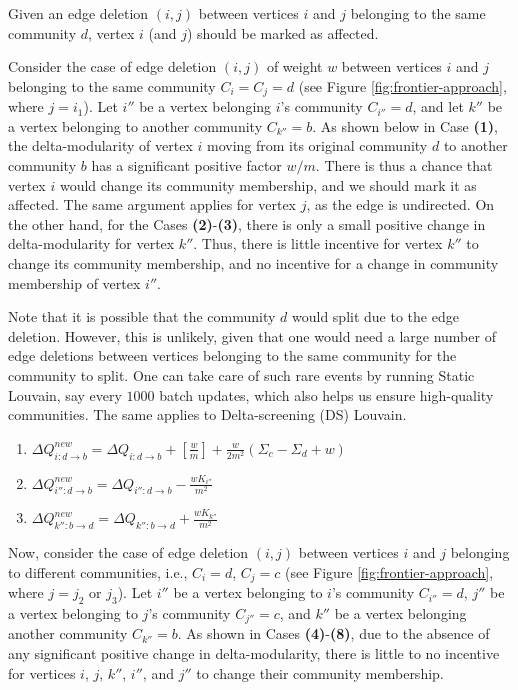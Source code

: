 \begin{lemma}
\label{thm:louvain--mark-deletion}
Given an edge deletion $(i, j)$ between vertices $i$ and $j$ belonging to the same community $d$, vertex $i$ (and $j$) should be marked as affected.
\end{lemma}

Consider the case of edge deletion $(i, j)$ of weight $w$ between vertices $i$ and $j$ belonging to the same community $C_i = C_j = d$ (see Figure \ref{fig:frontier-approach}, where $j = i_1$). Let $i''$ be a vertex belonging $i$'s community $C_{i''} = d$, and let $k''$ be a vertex belonging to another community $C_{k''} = b$. As shown below in Case \textbf{(1)}, the delta-modularity of vertex $i$ moving from its original community $d$ to another community $b$ has a significant positive factor $w/m$. There is thus a chance that vertex $i$ would change its community membership, and we should mark it as affected. The same argument applies for vertex $j$, as the edge is undirected. On the other hand, for the Cases \textbf{(2)}-\textbf{(3)}, there is only a small positive change in delta-modularity for vertex $k''$. Thus, there is little incentive for vertex $k''$ to change its community membership, and no incentive for a change in community membership of vertex $i''$.

Note that it is possible that the community $d$ would split due to the edge deletion. However, this is unlikely, given that one would need a large number of edge deletions between vertices belonging to the same community for the community to split. One can take care of such rare events by running Static Louvain, say every $1000$ batch updates, which also helps us ensure high-quality communities. The same applies to Delta-screening (DS) Louvain.

\begin{enumerate}
  \item $\Delta Q_{i:d \rightarrow b}^{new} = \Delta Q_{i:d \rightarrow b} + [\frac{w}{m}] + \frac{w}{2m^2} (\Sigma_c - \Sigma_d + w)$
  \item $\Delta Q_{i'':d \rightarrow b}^{new} = \Delta Q_{i'':d \rightarrow b} - \frac{wK_{i''}}{m^2}$
  \item $\Delta Q_{k'':b \rightarrow d}^{new} = \Delta Q_{k'':b \rightarrow d} + \frac{wK_{k''}}{m^2}$
\end{enumerate}

Now, consider the case of edge deletion $(i, j)$ between vertices $i$ and $j$ belonging to different communities, i.e., $C_i = d$, $C_j = c$ (see Figure \ref{fig:frontier-approach}, where $j = j_2$ or $j_3$). Let $i''$ be a vertex belonging to $i$'s community $C_{i''} = d$, $j''$ be a vertex belonging to $j$'s community $C_{j''} = c$, and $k''$ be a vertex belonging another community $C_{k''} = b$. As shown in Cases \textbf{(4)}-\textbf{(8)}, due to the absence of any significant positive change in delta-modularity, there is little to no incentive for vertices $i$, $j$, $k''$, $i''$, and $j''$ to change their community membership.

